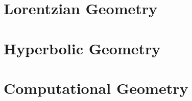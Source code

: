 \documentclass[11pt,a4paper,openany]{book}
\begin{document}

\part{Lorentzian Geometry}





\part{Hyperbolic Geometry}










\part{Computational Geometry}
\end{document}
